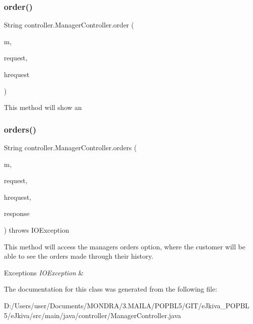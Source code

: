 \subsubsection{\texorpdfstring{order()}{order()}}
{\footnotesize\ttfamily String controller.\+Manager\+Controller.\+order (\begin{DoxyParamCaption}\item[{Model}]{m,  }\item[{Web\+Request}]{request,  }\item[{Http\+Servlet\+Request}]{hrequest }\end{DoxyParamCaption})\hspace{0.3cm}{\ttfamily [inline]}}

This method will show an \mbox{\label{classcontroller_1_1_manager_controller_a59689dd37c44b3294edc931668e57fb0}} 
\subsubsection{\texorpdfstring{orders()}{orders()}}
{\footnotesize\ttfamily String controller.\+Manager\+Controller.\+orders (\begin{DoxyParamCaption}\item[{Model}]{m,  }\item[{Web\+Request}]{request,  }\item[{Http\+Servlet\+Request}]{hrequest,  }\item[{Http\+Servlet\+Response}]{response }\end{DoxyParamCaption}) throws I\+O\+Exception\hspace{0.3cm}{\ttfamily [inline]}}

This method will access the manager\textquotesingle{}s \textquotesingle{}orders\textquotesingle{} option, where the customer will be able to see the orders made through their history. 
\begin{DoxyExceptions}{Exceptions}
{\em I\+O\+Exception} & \\
\hline
\end{DoxyExceptions}


The documentation for this class was generated from the following file\+:\begin{DoxyCompactItemize}
\item 
D\+:/\+Users/user/\+Documents/\+M\+O\+N\+D\+R\+A/3.\+M\+A\+I\+L\+A/\+P\+O\+P\+B\+L5/\+G\+I\+T/e\+Jkiva\+\_\+\+P\+O\+P\+B\+L5/e\+Jkiva/src/main/java/controller/Manager\+Controller.\+java\end{DoxyCompactItemize}
